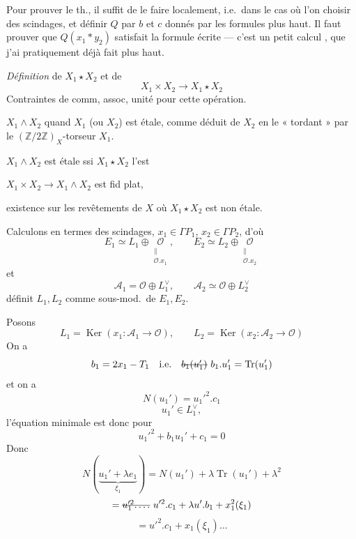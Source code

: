 \documentclass[11pt,a4paper]{article}
\begin{document}
Pour prouver le th., il suffit de le faire localement, i.e.\ dans le cas où l'on  choisir des scindages, et définir $Q$ \ill{} par $b$ et $c$ donnés par les formules plus haut. Il faut prouver que $Q(x_1 * y_2)$ satisfait la formule  écrite --- c'est un petit calcul , que j'ai pratiquement déjà fait plus haut.

\emph{Définition} de $X_1 \star X_2$ et de
\[
  X_1 \times X_2 \longrightarrow X_1 \star X_2
\]
Contraintes de comm, assoc, unité pour cette opération.

$X_1 \wedge X_2$ quand $X_1$ (ou $X_2$) est étale, comme déduit de $X_2$ en le « tordant » par le $(\mathbb{Z}/2\mathbb{Z})_X$-torseur $X_1$.

$X_1 \wedge X_2$ est étale ssi $X_1 \star X_2$ l'est

$X_1 \times X_2 \to X_1 \wedge X_2$ est fid plat, \ill{}

existence sur les revêtements de $X$  \add{\ill{}}  où $X_1 \star X_2$ est non étale.

Calculons en termes des scindages, \ill{} $x_1 \in \Gamma P_1$, $x_2 \in \Gamma P_2$, d'où
\[
  E_1 \simeq L_1 \oplus \underset{\substack{\| \\ \mathcal{O}.x_1}}{\mathcal{O}} , \qquad E_2 \simeq L_2 \oplus \underset{\substack{\| \\ \mathcal{O}.x_2}}{\mathcal{O}}
\]
et
\[
  \mathcal{A}_1 = \mathcal{O} \oplus L_1^{\vee} , \qquad \mathcal{A}_2 \simeq \mathcal{O} \oplus L_2^{\vee}
\]
  définit $L_1, L_2$ comme sous-mod.\ de $E_1, E_2$.

Posons
\[
  L_1 = \operatorname{Ker}(x_1 : \mathcal{A}_1 \to \mathcal{O}) , \qquad L_2 = \operatorname{Ker}(x_2 : \mathcal{A}_2 \to \mathcal{O})
\]
On a
\[
  b_1 = 2x_1 - T_1 \quad \text{i.e.} \quad \text{\struck{$b_1(u_1')$}}\ b_1 . u_1' = \operatorname{Tr}(u_1')
\]
et on a
\[
  N(u_1') = u_1'^2 . c_1
\]
\[
  u_1' \in L_1^{\vee} ,
\]
l'équation minimale  est
donc pour
\[
  u_1'^2 + b_1 u_1' + c_1 = 0
\]
Donc
\[
  N(\underbrace{u_1' + \lambda e_1}_{\xi_1}) = N(u_1') + \lambda \operatorname{Tr}(u_1') + \lambda^2
\]
\[
  = \text{\struck{$u_1'^2 . \ldots$}}\ u'^2 . c_1 + \lambda u' . b_1 + x_1^2(\xi_1)
\]
\[
  = u'^2 . c_1 + x_1(\xi_1) \ldots
\]
\end{document}
